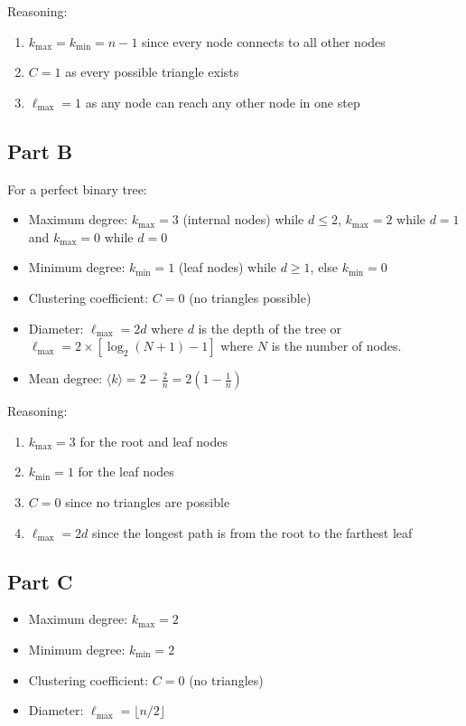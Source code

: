 \documentclass[12pt]{article}
\begin{document}
\noindent Reasoning:
\begin{enumerate}
    \item $k_{\max} = k_{\min} = n-1$ since every node connects to all other nodes
    \item $C = 1$ as every possible triangle exists
    \item $\ell_{\max} = 1$ as any node can reach any other node in one step
\end{enumerate}

\subsection*{Part B}

For a perfect binary tree:
\begin{itemize}
    \item Maximum degree: $k_{\max} = 3$ (internal nodes) while $d \leq 2$, $k_{\max} = 2$ while $d = 1$ and $k_{\max} = 0$ while $d = 0$
    \item Minimum degree: $k_{\min} = 1$ (leaf nodes) while $d \geq 1$, else $k_{\min} = 0$
    \item Clustering coefficient: $C = 0$ (no triangles possible)
    \item Diameter: $\ell_{\max} = 2d$ where $d$ is the depth of the tree or $\ell_{\max} = 2 \times [\log_2 (N+1) - 1]$ where $N$ is the number of nodes.
    \item Mean degree: $\langle k \rangle = 2 - \frac{2}{n} = 2(1-\frac{1}{n})$
\end{itemize}

\noindent Reasoning:
\begin{enumerate}
    \item $k_{\max} = 3$ for the root and leaf nodes
    \item $k_{\min} = 1$ for the leaf nodes
    \item $C = 0$ since no triangles are possible
    \item $\ell_{\max} = 2d$ since the longest path is from the root to the farthest leaf
\end{enumerate}

\subsection*{Part C}

\begin{itemize}
    \item Maximum degree: $k_{\max} = 2$
    \item Minimum degree: $k_{\min} = 2$
    \item Clustering coefficient: $C = 0$ (no triangles)
    \item Diameter: $\ell_{\max} = \lfloor n/2 \rfloor$
\end{itemize}
\end{document}
